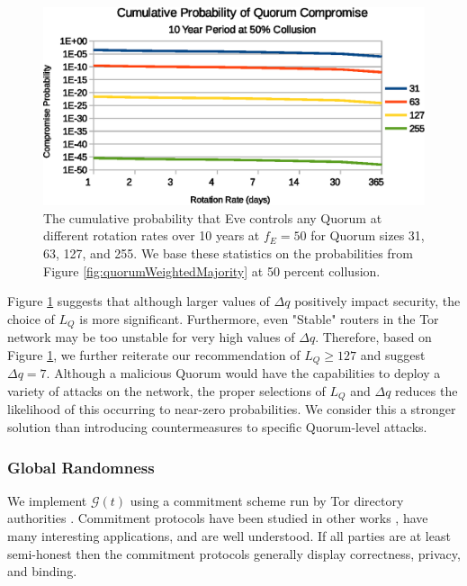 \documentclass[USenglish,oneside,twocolumn]{article}
\begin{document}
\begin{figure}[h]
	\centering
	\includegraphics[width=\linewidth]{../assets/analysis/CumulativeMaliciousQuorumNew.eps}
	\caption{The cumulative probability that Eve controls any Quorum at different rotation rates over 10 years at $ f_{E} = 50 $ for Quorum sizes 31, 63, 127, and 255. We base these statistics on the probabilities from Figure \ref{fig:quorumWeightedMajority} at 50 percent collusion.}
	\label{fig:cumulativeProbability}
\end{figure}

Figure \ref{fig:cumulativeProbability} suggests that although larger values of $ \Delta q $ positively impact security, the choice of $ L_{Q} $ is more significant. Furthermore, even "Stable" routers in the Tor network may be too unstable for very high values of $ \Delta q $. Therefore, based on Figure \ref{fig:cumulativeProbability}, we further reiterate our recommendation of $ L_{Q} \geq 127 $ and suggest $ \Delta q = 7 $. Although a malicious Quorum would have the capabilities to deploy a variety of attacks on the network, the proper selections of $ L_{Q} $ and $ \Delta q $ reduces the likelihood of this occurring to near-zero probabilities. We consider this a stronger solution than introducing countermeasures to specific Quorum-level attacks.

\subsubsection{Global Randomness}
\label{sec:RandGeneration}

We implement $ \mathcal{G}(t) $ using a commitment scheme run by Tor directory authorities \cite{GouletCommitReveal}. Commitment protocols have been studied in other works \cite{rivest1999unconditionally, naor1990bit}, have many interesting applications, and are well understood. If all parties are at least semi-honest then the commitment protocols generally display correctness, privacy, and binding. 
\end{document}
